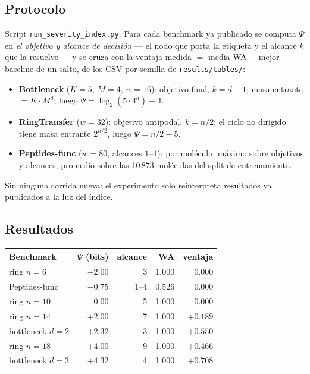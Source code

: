 \documentclass[11pt]{article}
\begin{document}
\subsection{Protocolo}

Script \texttt{run\_severity\_index.py}. Para cada benchmark ya publicado se
computa $\Psi$ en \emph{el objetivo y alcance de decisi\'on} --- el nodo que
porta la etiqueta y el alcance $k$ que la resuelve --- y se cruza con la
ventaja medida $=$ media WA $-$ mejor baseline de un salto, de los CSV por
semilla de \texttt{results/tables/}:
\begin{itemize}
  \item \textbf{Bottleneck} ($K{=}5$, $M{=}4$, $w{=}16$): objetivo final,
  $k=d{+}1$; masa entrante $=K\!\cdot\!M^{d}$, luego
  $\Psi=\log_2(5\cdot4^{d})-4$.
  \item \textbf{RingTransfer} ($w{=}32$): objetivo antipodal, $k=n/2$; el
  ciclo no dirigido tiene masa entrante $2^{n/2}$, luego $\Psi=n/2-5$.
  \item \textbf{Peptides-func} ($w{=}80$, alcances $1$--$4$): por mol\'ecula,
  m\'aximo sobre objetivos y alcances; promedio sobre las 10\,873 mol\'eculas
  del split de entrenamiento.
\end{itemize}
Sin ninguna corrida nueva: el experimento solo reinterpreta resultados ya
publicados a la luz del \'indice.

\subsection{Resultados}

\begin{center}
\begin{tabular}{lrrrr}
\toprule
\textbf{Benchmark} & $\Psi$ (bits) & \textbf{alcance} & \textbf{WA} &
\textbf{ventaja}\\
\midrule
ring $n{=}6$        & $-2.00$ & 3   & 1.000 & 0.000\\
Peptides-func       & $-0.75$ & 1--4& 0.526 & 0.000\\
ring $n{=}10$       & $0.00$  & 5   & 1.000 & 0.000\\
ring $n{=}14$       & $+2.00$ & 7   & 1.000 & $+0.189$\\
bottleneck $d{=}2$  & $+2.32$ & 3   & 1.000 & $+0.550$\\
ring $n{=}18$       & $+4.00$ & 9   & 1.000 & $+0.466$\\
bottleneck $d{=}3$  & $+4.32$ & 4   & 1.000 & $+0.708$\\
\bottomrule
\end{tabular}
\end{center}
\end{document}
